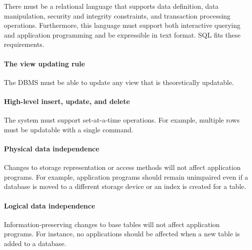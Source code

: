 \documentclass[
]{article}
\begin{document}
There must be a relational language that supports data definition, data
manipulation, security and integrity constraints, and transaction
processing operations. Furthermore, this language must support both
interactive querying and application programming and be expressible in
text format. SQL fits these requirements.

\hypertarget{the-view-updating-rule}{%
\paragraph*{The view updating rule}\label{the-view-updating-rule}}

The DBMS must be able to update any view that is theoretically
updatable.

\hypertarget{high-level-insert-update-and-delete}{%
\paragraph*{High-level insert, update, and delete}\label{high-level-insert-update-and-delete}}

The system must support set-at-a-time operations. For example, multiple
rows must be updatable with a single command.

\hypertarget{physical-data-independence}{%
\paragraph*{Physical data independence}\label{physical-data-independence}}

Changes to storage representation or access methods will not affect
application programs. For example, application programs should remain
unimpaired even if a database is moved to a different storage device or
an index is created for a table.

\hypertarget{logical-data-independence}{%
\paragraph*{Logical data independence}\label{logical-data-independence}}

Information-preserving changes to base tables will not affect
application programs. For instance, no applications should be affected
when a new table is added to a database.
\end{document}
